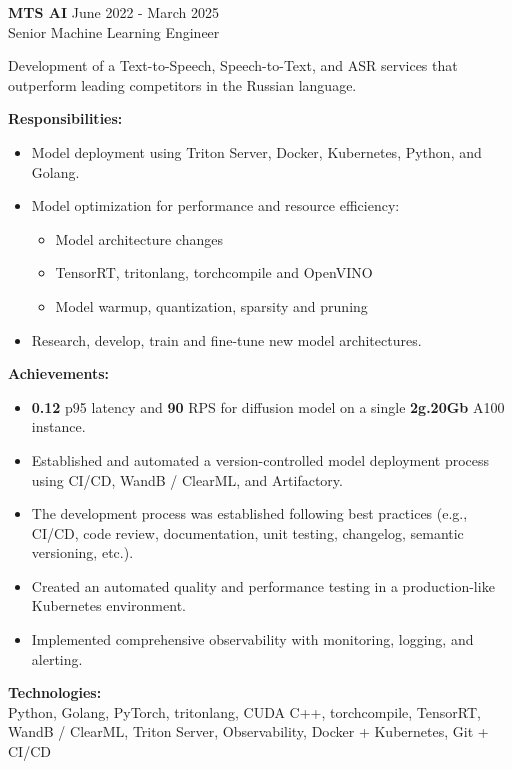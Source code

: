 \textbf{MTS AI} \hfill June 2022 - March 2025 \\
Senior Machine Learning Engineer

Development of a Text-to-Speech, Speech-to-Text, and ASR services that outperform leading competitors in the Russian language.

\textbf{Responsibilities:}

\begin{itemize}[left=0pt, label={--}]
    \item Model deployment using Triton Server, Docker, Kubernetes, Python, and Golang.
    \item Model optimization for performance and resource efficiency:
    \begin{itemize}[topsep=0pt]
        \item Model architecture changes
        \item TensorRT, tritonlang, torchcompile and OpenVINO
        \item Model warmup, quantization, sparsity and pruning
    \end{itemize}
    \item Research, develop, train and fine-tune new model architectures.
\end{itemize}

\textbf{Achievements:}

\begin{itemize}[left=0pt, label={--}]
    \item \textbf{0.12} p95 latency and \textbf{90} RPS for diffusion model on a single \textbf{2g.20Gb} A100 instance.
    \item Established and automated a version-controlled model deployment process using CI/CD, WandB / ClearML, and Artifactory.
    \item The development process was established following best practices (e.g., CI/CD, code review, documentation, unit testing, changelog, semantic versioning, etc.).
    \item Created an automated quality and performance testing in a production-like Kubernetes environment.
    \item Implemented comprehensive observability with monitoring, logging, and alerting.
\end{itemize}

\textbf{Technologies:} \\
Python, Golang, PyTorch, tritonlang, CUDA C++, torchcompile, TensorRT, WandB / ClearML, Triton Server, Observability, Docker + Kubernetes, Git + CI/CD

